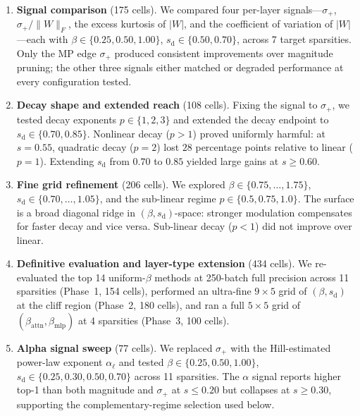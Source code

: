 \documentclass[11pt]{article}
\theoremstyle{plain}
\theoremstyle{definition}
\theoremstyle{remark}
\newcommand{\1}{\mathbf{1}}
\begin{document}
\begin{enumerate}[leftmargin=2em]
\item \textbf{Signal comparison} (175 cells).  We compared four per-layer signals---\(\sigma_+\), \(\sigma_+/\|W\|_F\), the excess kurtosis of \(|W|\), and the coefficient of variation of \(|W|\)---each with \(\beta\in\{0.25,0.50,1.00\}\), \(s_{\mathrm{d}}\in\{0.50,0.70\}\), across 7 target sparsities.  Only the MP edge \(\sigma_+\) produced consistent improvements over magnitude pruning; the other three signals either matched or degraded performance at every configuration tested.

\item \textbf{Decay shape and extended reach} (108 cells).  Fixing the signal to \(\sigma_+\), we tested decay exponents \(p\in\{1,2,3\}\) and extended the decay endpoint to \(s_{\mathrm{d}}\in\{0.70,0.85\}\).  Nonlinear decay (\(p>1\)) proved uniformly harmful: at \(s=0.55\), quadratic decay (\(p=2\)) lost \(28\) percentage points relative to linear (\(p=1\)).  Extending \(s_{\mathrm{d}}\) from \(0.70\) to \(0.85\) yielded large gains at \(s\ge 0.60\).

\item \textbf{Fine grid refinement} (206 cells).  We explored \(\beta\in\{0.75,\dots,1.75\}\), \(s_{\mathrm{d}}\in\{0.70,\dots,1.05\}\), and the sub-linear regime \(p\in\{0.5,0.75,1.0\}\).  The surface is a broad diagonal ridge in \((\beta, s_{\mathrm{d}})\)-space: stronger modulation compensates for faster decay and vice versa.  Sub-linear decay (\(p<1\)) did not improve over linear.

\item \textbf{Definitive evaluation and layer-type extension} (434 cells).  We re-evaluated the top 14 uniform-\(\beta\) methods at 250-batch full precision across 11 sparsities (Phase~1, 154 cells), performed an ultra-fine \(9\times 5\) grid of \((\beta, s_{\mathrm{d}})\) at the cliff region (Phase~2, 180 cells), and ran a full \(5\times 5\) grid of \((\beta_{\mathrm{attn}}, \beta_{\mathrm{mlp}})\) at 4 sparsities (Phase~3, 100 cells).

\item \textbf{Alpha signal sweep} (77 cells).  We replaced \(\sigma_+\) with the Hill-estimated power-law exponent \(\alpha_\ell\) and tested \(\beta\in\{0.25,0.50,1.00\}\), \(s_{\mathrm{d}}\in\{0.25,0.30,0.50,0.70\}\) across 11 sparsities.  The \(\alpha\) signal reports higher top-1 than both magnitude and \(\sigma_+\) at \(s\le 0.20\) but collapses at \(s\ge 0.30\), supporting the complementary-regime selection used below.
\end{enumerate}
\end{document}

